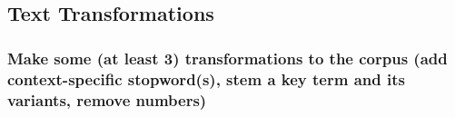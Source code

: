 \documentclass[
]{article}
\begin{document}
\hypertarget{text-transformations}{%
\subsection{Text Transformations}\label{text-transformations}}

\hypertarget{make-some-at-least-3-transformations-to-the-corpus-add-context-specific-stopwords-stem-a-key-term-and-its-variants-remove-numbers}{%
\subsubsection{Make some (at least 3) transformations to the corpus (add
context-specific stopword(s), stem a key term and its variants, remove
numbers)}\label{make-some-at-least-3-transformations-to-the-corpus-add-context-specific-stopwords-stem-a-key-term-and-its-variants-remove-numbers}}
\end{document}
